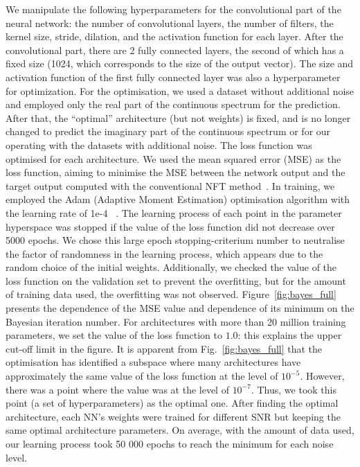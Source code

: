 We manipulate the following hyperparameters for the convolutional part of the neural network: the number of convolutional layers, the number of filters, the kernel size, stride, dilation, and the activation function for each layer. After the convolutional part, there are 2 fully connected layers, the second of which has a fixed size (1024, which corresponds to the size of the output vector). The size and activation function of the first fully connected layer was also a hyperparameter for optimization.
For the optimisation, we used a dataset without additional noise and employed only the real part of the continuous spectrum for the prediction. After that, the ``optimal'' architecture (but not weights) is fixed, and is no longer changed to predict the imaginary part of the continuous spectrum or for our operating with the datasets with additional noise.
The loss function was optimised for each architecture. We used the mean squared error (MSE) as the loss function, aiming to minimise the MSE between the network output and the target output computed with the conventional NFT method~\cite{FNFT2018}. In training, we employed the Adam (Adaptive Moment Estimation) optimisation algorithm with the learning rate of 1e-4 ~\cite{s2000adaptive}. 
The learning process of each point in the parameter hyperspace was stopped if the value of the loss function did not decrease over 5000 epochs. 
We chose this large epoch stopping-criterium number to neutralise the factor of randomness in the learning process, which appears due to the random choice of the initial weights. Additionally, we checked the value of the loss function on the validation set to prevent the overfitting, but for the amount of training data used, the overfitting was not observed. 
Figure~\ref{fig:bayes_full} presents the dependence of the MSE value and dependence of its minimum on the  Bayesian iteration number. For architectures with more than 20 million training parameters, we set the value of the loss function to $1.0$: this explains the upper cut-off limit in the figure. It is apparent from Fig.~\ref{fig:bayes_full} that the optimisation has identified a subspace where many architectures have approximately the same value of the loss function at the level of $10^{-5}$. However, there was a point where the value was at the level of $10^{-7}$. Thus, we took this point (a set of hyperparameters) as the optimal one.
After finding the optimal architecture, each NN's weights were trained for different SNR but keeping the same optimal architecture parameters. On average, with the amount of data used, our learning process took 50 000 epochs to reach the minimum for each noise level.

